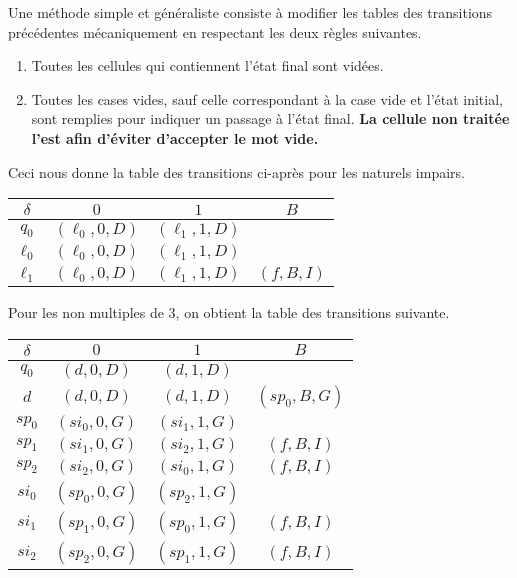 Une méthode simple et généraliste consiste à modifier les tables des transitions précédentes mécaniquement en respectant les deux règles suivantes.
\begin{enumerate}
	\item Toutes les cellules qui contiennent l'état final sont vidées.

	\item Toutes les cases vides, sauf celle correspondant à la case vide et l'état initial, sont remplies pour indiquer un passage à l'état final. 
	      \textbf{La cellule non traitée l'est afin d'éviter d'accepter le mot vide.} 
\end{enumerate}



Ceci nous donne la table des transitions ci-après pour les naturels impairs.
\begin{center}
	\begin{tabular}{|c||c|c|c|}
		\hline
		$\delta$ 
			& $0$ 
			& $1$
			& $B$ \\
		\hline
		\hline
		$q_0$
			& $(\ell_0 , 0 , D)$
			& $(\ell_1 , 1 , D)$
			&                     \\
		\hline
		\hline
		$\ell_0$
			& $(\ell_0 , 0 , D)$
			& $(\ell_1 , 1 , D)$
			&                     \\
		\hline
		$\ell_1$
			& $(\ell_0 , 0 , D)$
			& $(\ell_1 , 1 , D)$
			& $(f      , B , I)$ \\
		\hline
	\end{tabular}
\end{center}


Pour les non multiples de $3$, on obtient la table des transitions suivante.
\begin{center}
	\begin{tabular}{|c||c|c|c|}
		\hline
		$\delta$ 
			& $0$ 
			& $1$
			& $B$ \\
		\hline
		\hline
		$q_0$ 
			& $(d , 0, D)$ 
			& $(d , 1, D)$
			&  \\
		\hline
		$d$ 
			& $(d , 0, D)$ 
			& $(d , 1, D)$
			& $(sp_0, B, G)$ \\
		\hline
		\hline
		$sp_0$ 
			& $(si_0 , 0, G)$ 
			& $(si_1 , 1, G)$
			&                 \\
		\hline
		$sp_1$ 
			& $(si_1 , 0, G)$ 
			& $(si_2 , 1, G)$
			& $(f    , B, I)$ \\
		\hline
		$sp_2$ 
			& $(si_2 , 0, G)$ 
			& $(si_0 , 1, G)$
			& $(f    , B, I)$ \\
		\hline
		\hline
		$si_0$ 
			& $(sp_0 , 0, G)$ 
			& $(sp_2 , 1, G)$
			&                 \\
		\hline
		$si_1$ 
			& $(sp_1 , 0, G)$ 
			& $(sp_0 , 1, G)$
			& $(f    , B, I)$ \\
		\hline
		$si_2$ 
			& $(sp_2 , 0, G)$ 
			& $(sp_1 , 1, G)$
			& $(f    , B, I)$ \\
		\hline
	\end{tabular}
\end{center}


